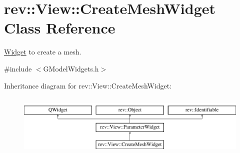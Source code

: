 \hypertarget{classrev_1_1_view_1_1_create_mesh_widget}{}\section{rev\+::View\+::Create\+Mesh\+Widget Class Reference}
\label{classrev_1_1_view_1_1_create_mesh_widget}


\mbox{\hyperlink{class_widget}{Widget}} to create a mesh.  




{\ttfamily \#include $<$G\+Model\+Widgets.\+h$>$}

Inheritance diagram for rev\+::View\+::Create\+Mesh\+Widget\+:\begin{figure}[H]
\begin{center}
\leavevmode
\includegraphics[height=3.000000cm]{classrev_1_1_view_1_1_create_mesh_widget}
\end{center}
\end{figure}
